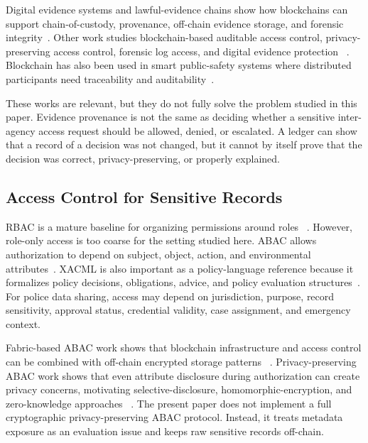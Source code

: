 Digital evidence systems and lawful-evidence chains show how blockchains can
support chain-of-custody, provenance, off-chain evidence storage, and forensic
integrity~\cite{kim_two_level_2021,li_lechain_2021,jeong_fabric_evidence_2020}.
Other work studies blockchain-based auditable access control, privacy-preserving
access control, forensic log access, and digital evidence protection
~\cite{akhtar_auditable_access_2020,rouhani_access_control_survey_2019,hu_accountable_private_ac_2024,islam_forensic_log_2023,banerjee_dashdikpala_2026}.
Blockchain has also been used in smart public-safety systems where distributed
participants need traceability and auditability~\cite{xu_blendsps_2020}.

These works are relevant, but they do not fully solve the problem studied in
this paper. Evidence provenance is not the same as deciding whether a sensitive
inter-agency access request should be allowed, denied, or escalated. A ledger
can show that a record of a decision was not changed, but it cannot by itself
prove that the decision was correct, privacy-preserving, or properly explained.

\subsection{Access Control for Sensitive Records}

RBAC is a mature baseline for organizing permissions around roles
~\cite{sandhu_rbac_1996}. However, role-only access is too coarse for the
setting studied here. ABAC allows authorization to depend on subject, object,
action, and environmental attributes~\cite{nist_abac_2014}. XACML is also
important as a policy-language reference because it formalizes policy decisions,
obligations, advice, and policy evaluation structures~\cite{oasis_xacml_2013}.
For police data sharing, access may depend on jurisdiction, purpose, record
sensitivity, approval status, credential validity, case assignment, and
emergency context.

Fabric-based ABAC work shows that blockchain infrastructure and access control
can be combined with off-chain encrypted storage patterns
~\cite{zhao_fabric_abac_2022}. Privacy-preserving ABAC work shows that even
attribute disclosure during authorization can create privacy concerns, motivating
selective-disclosure, homomorphic-encryption, and zero-knowledge approaches
~\cite{kerl_privacy_abac_2025}. The present paper does not implement a full
cryptographic privacy-preserving ABAC protocol. Instead, it treats metadata
exposure as an evaluation issue and keeps raw sensitive records off-chain.

